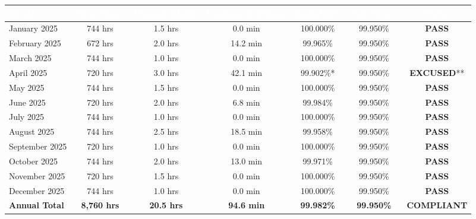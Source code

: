 \documentclass[11pt,a4paper]{scrartcl}
\begin{document}
\begin{footnotesize}
\begin{tabularx}{\textwidth}{@{} >{\raggedright\arraybackslash}X c c c c c c @{}}
    \toprule
    \rowcolor{navyblue}
    \textcolor{white}{\textbf{Month}} & 
    \textcolor{white}{\textbf{Total Hours}} & 
    \textcolor{white}{\textbf{Planned Maint.}} & 
    \textcolor{white}{\textbf{Unplanned Outage}} & 
    \textcolor{white}{\textbf{Availability}} & 
    \textcolor{white}{\textbf{SLA Target}} & 
    \textcolor{white}{\textbf{Status}} \\
    \midrule
    \rowcolor{cardbg} January 2025   & 744 hrs & 1.5 hrs & 0.0 min  & 100.000\% & 99.950\% & \textcolor{statusgreen}{\textbf{PASS}} \\
    \rowcolor{white} February 2025  & 672 hrs & 2.0 hrs & 14.2 min & 99.965\%  & 99.950\% & \textcolor{statusgreen}{\textbf{PASS}} \\
    \rowcolor{cardbg} March 2025     & 744 hrs & 1.0 hrs & 0.0 min  & 100.000\% & 99.950\% & \textcolor{statusgreen}{\textbf{PASS}} \\
    \rowcolor{white} April 2025     & 720 hrs & 3.0 hrs & 42.1 min & 99.902\%* & 99.950\% & \textcolor{statusamber}{\textbf{EXCUSED}}** \\
    \rowcolor{cardbg} May 2025       & 744 hrs & 1.5 hrs & 0.0 min  & 100.000\% & 99.950\% & \textcolor{statusgreen}{\textbf{PASS}} \\
    \rowcolor{white} June 2025      & 720 hrs & 2.0 hrs & 6.8 min  & 99.984\%  & 99.950\% & \textcolor{statusgreen}{\textbf{PASS}} \\
    \rowcolor{cardbg} July 2025      & 744 hrs & 1.0 hrs & 0.0 min  & 100.000\% & 99.950\% & \textcolor{statusgreen}{\textbf{PASS}} \\
    \rowcolor{white} August 2025    & 744 hrs & 2.5 hrs & 18.5 min & 99.958\%  & 99.950\% & \textcolor{statusgreen}{\textbf{PASS}} \\
    \rowcolor{cardbg} September 2025 & 720 hrs & 1.0 hrs & 0.0 min  & 100.000\% & 99.950\% & \textcolor{statusgreen}{\textbf{PASS}} \\
    \rowcolor{white} October 2025   & 744 hrs & 2.0 hrs & 13.0 min & 99.971\%  & 99.950\% & \textcolor{statusgreen}{\textbf{PASS}} \\
    \rowcolor{cardbg} November 2025  & 720 hrs & 1.5 hrs & 0.0 min  & 100.000\% & 99.950\% & \textcolor{statusgreen}{\textbf{PASS}} \\
    \rowcolor{white} December 2025  & 744 hrs & 1.0 hrs & 0.0 min  & 100.000\% & 99.950\% & \textcolor{statusgreen}{\textbf{PASS}} \\
    \midrule
    \rowcolor{cardbg} \textbf{Annual Total} & \textbf{8,760 hrs} & \textbf{20.5 hrs} & \textbf{94.6 min} & \textbf{99.982\%} & \textbf{99.950\%} & \textcolor{statusgreen}{\textbf{COMPLIANT}} \\
    \bottomrule
\end{tabularx}
\end{footnotesize}
\end{document}
